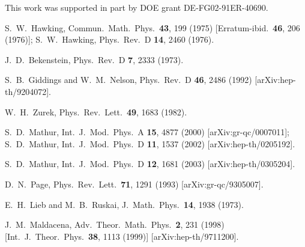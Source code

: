 \documentclass[12pt]{article}
\begin{document}
 This work was supported in part by DOE grant DE-FG02-91ER-40690.




\newpage

\begin{thebibliography}{99}


  S.~W.~Hawking,
  Commun.\ Math.\ Phys.\  {\bf 43}, 199 (1975)
  [Erratum-ibid.\  {\bf 46}, 206 (1976)];
  S.~W.~Hawking,
  Phys.\ Rev.\  D {\bf 14}, 2460 (1976).
  
J.~D.~Bekenstein,
Phys.\ Rev.\ D {\bf 7}, 2333 (1973).
%

  S.~B.~Giddings and W.~M.~Nelson,
  Phys.\ Rev.\  D {\bf 46}, 2486 (1992)
  [arXiv:hep-th/9204072].
  
  W.~H.~Zurek,
  Phys.\ Rev.\ Lett.\  {\bf 49}, 1683 (1982).


  S.~D.~Mathur,
  Int.\ J.\ Mod.\ Phys.\  A {\bf 15}, 4877 (2000)
  [arXiv:gr-qc/0007011];
  S.~D.~Mathur,
  Int.\ J.\ Mod.\ Phys.\  D {\bf 11}, 1537 (2002)
  [arXiv:hep-th/0205192].
  
  S.~D.~Mathur,
  Int.\ J.\ Mod.\ Phys.\  D {\bf 12}, 1681 (2003)
  [arXiv:hep-th/0305204].

  D.~N.~Page,
  Phys.\ Rev.\ Lett.\  {\bf 71}, 1291 (1993)
  [arXiv:gr-qc/9305007].
  
  E.~H.~Lieb and M.~B.~Ruskai,
  J.\ Math.\ Phys.\  {\bf 14}, 1938 (1973).

  J.~M.~Maldacena,
  Adv.\ Theor.\ Math.\ Phys.\  {\bf 2}, 231 (1998)
  [Int.\ J.\ Theor.\ Phys.\  {\bf 38}, 1113 (1999)]
  [arXiv:hep-th/9711200].


\end{thebibliography}
\end{document}
